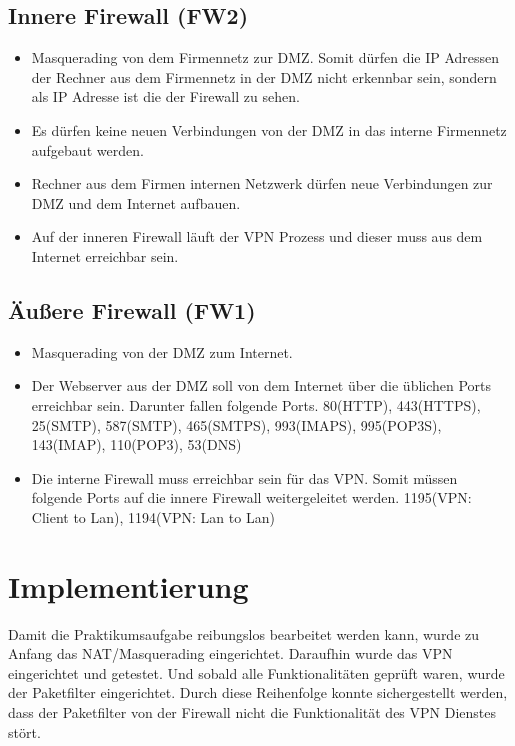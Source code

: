 \subsection{Innere Firewall (FW2)}
\begin{itemize}
\item Masquerading von dem Firmennetz zur DMZ. Somit dürfen die IP Adressen der Rechner aus dem Firmennetz in der DMZ nicht erkennbar sein, sondern als IP Adresse ist die der Firewall zu sehen.
\item Es dürfen keine neuen Verbindungen von der DMZ in das interne Firmennetz aufgebaut werden.
\item Rechner aus dem Firmen internen Netzwerk dürfen neue Verbindungen zur DMZ und dem Internet aufbauen.
\item Auf der inneren Firewall läuft der VPN Prozess und dieser muss aus dem Internet erreichbar sein.	
\end{itemize}

\subsection{Äußere Firewall (FW1)}
\begin{itemize}
\item Masquerading von der DMZ zum Internet.
\item Der Webserver aus der DMZ soll von dem Internet über die üblichen Ports erreichbar sein. Darunter fallen folgende Ports. 80(HTTP), 443(HTTPS), 25(SMTP), 587(SMTP), 465(SMTPS), 993(IMAPS), 995(POP3S), 143(IMAP), 110(POP3), 53(DNS)
\item Die interne Firewall muss erreichbar sein für das VPN. Somit müssen folgende Ports auf die innere Firewall weitergeleitet werden. 1195(VPN: Client to Lan), 1194(VPN: Lan to Lan)
\end{itemize}

\section{Implementierung}
Damit die Praktikumsaufgabe reibungslos bearbeitet werden kann, wurde zu Anfang das NAT/Masquerading eingerichtet. Daraufhin wurde das VPN eingerichtet und getestet. Und sobald alle Funktionalitäten geprüft waren, wurde der Paketfilter eingerichtet. Durch diese Reihenfolge konnte sichergestellt werden, dass der Paketfilter von der Firewall nicht die Funktionalität des VPN Dienstes stört.

